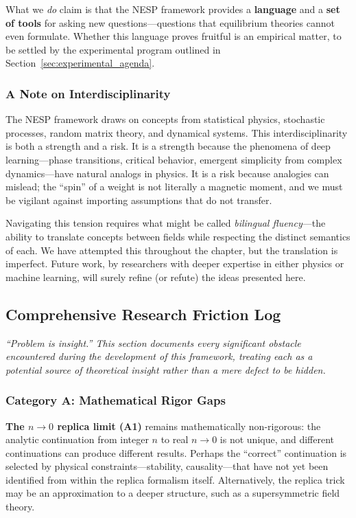 \documentclass[
  journal=largetwo,
  simfonts=false,
  year=2025,
  volume=37,
]{cup-journal}
\begin{document}
What we \textit{do} claim is that the NESP framework provides a \textbf{language} and a \textbf{set of tools} for asking new questions---questions that equilibrium theories cannot even formulate. Whether this language proves fruitful is an empirical matter, to be settled by the experimental program outlined in Section~\ref{sec:experimental_agenda}.

\subsubsection{A Note on Interdisciplinarity}

The NESP framework draws on concepts from statistical physics, stochastic processes, random matrix theory, and dynamical systems. This interdisciplinarity is both a strength and a risk. It is a strength because the phenomena of deep learning---phase transitions, critical behavior, emergent simplicity from complex dynamics---have natural analogs in physics. It is a risk because analogies can mislead; the ``spin'' of a weight is not literally a magnetic moment, and we must be vigilant against importing assumptions that do not transfer.

Navigating this tension requires what might be called \textit{bilingual fluency}---the ability to translate concepts between fields while respecting the distinct semantics of each. We have attempted this throughout the chapter, but the translation is imperfect. Future work, by researchers with deeper expertise in either physics or machine learning, will surely refine (or refute) the ideas presented here.

\subsection{Comprehensive Research Friction Log}\label{sec:friction_log}

\textit{``Problem is insight.'' This section documents every significant obstacle encountered during the development of this framework, treating each as a potential source of theoretical insight rather than a mere defect to be hidden.}

\subsubsection{Category A: Mathematical Rigor Gaps}

\textbf{The $n \to 0$ replica limit (A1)} remains mathematically non-rigorous: the analytic continuation from integer $n$ to real $n \to 0$ is not unique, and different continuations can produce different results. Perhaps the ``correct'' continuation is selected by physical constraints---stability, causality---that have not yet been identified from within the replica formalism itself. Alternatively, the replica trick may be an approximation to a deeper structure, such as a supersymmetric field theory.
\end{document}
